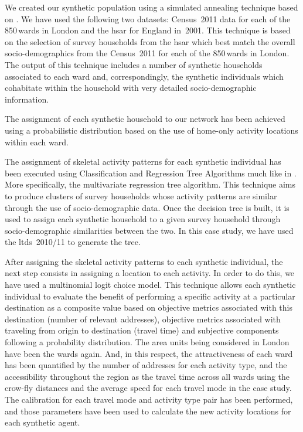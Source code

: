 We created our synthetic population using a simulated annealing technique based on \citet[][]{metropolissampling}. We have used the following two datasets: Census~2011 data for each of the 850\,wards in London and the \gls{hsar} for England in~2001. This technique is based on the selection of survey households from the \gls{hsar} which best match the overall socio-demographics from the Census~2011 for each of the 850\,wards in London. The output of this technique includes a number of synthetic households associated to each ward and, correspondingly, the synthetic individuals which cohabitate within the household with very detailed socio-demographic information.

The assignment of each synthetic household to our network has been achieved using a probabilistic distribution based on the use of home-only activity locations within each ward.

The assignment of skeletal activity patterns for each synthetic individual has been executed using Classification and Regression Tree Algorithms much like in \citet[][]{SpeckmanEtAl_TechRep_NISS_1998}. 
More specifically, the multivariate regression tree algorithm. 
This technique aims to produce clusters of survey households whose activity patterns are similar through the use of socio-demographic data. 
Once the decision tree is built, it is used to assign each synthetic household to a given survey household through socio-demographic similarities between the two. 
In this case study, we have used the \gls{ltds}~2010/11 to generate the tree.

After assigning the skeletal activity patterns to each synthetic individual, the next step consists in assigning a location to each activity. 
In order to do this, we have used a multinomial logit choice model. This technique allows each synthetic individual to evaluate the benefit of performing a specific activity at a particular destination as a composite value based on objective metrics associated with this destination (\eg number of relevant addresses), objective metrics associated with traveling from origin to destination (\eg travel time) and subjective components following a probability distribution. The area units being considered in London have been the wards again. And, in this respect, the attractiveness of each ward has been quantified by the number of addresses for each activity type, and the accessibility throughout the region as the travel time across all wards using the crow-fly distances and the average speed for each travel mode in the case study. The calibration for each travel mode and activity type pair has been performed, and those parameters have been used to calculate the new activity locations for each synthetic agent.

